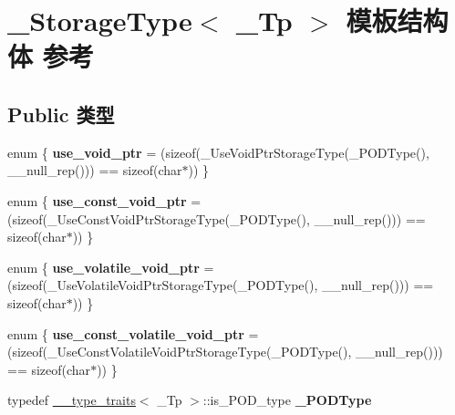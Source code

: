 \hypertarget{struct___storage_type}{}\section{\+\_\+\+Storage\+Type$<$ \+\_\+\+Tp $>$ 模板结构体 参考}
\label{struct___storage_type}
\subsection*{Public 类型}
\begin{DoxyCompactItemize}
\item 
\mbox{\label{struct___storage_type_ad8fc37c8da5e94bd646f970189a1dfbb}} 
enum \{ {\bfseries use\+\_\+void\+\_\+ptr} = (sizeof(\+\_\+\+Use\+Void\+Ptr\+Storage\+Type(\+\_\+\+P\+O\+D\+Type(), \+\_\+\+\_\+null\+\_\+rep())) == sizeof(char$\ast$))
 \}
\item 
\mbox{\label{struct___storage_type_a3dacabc4c811d5e5b0f2bfee4178b3bd}} 
enum \{ {\bfseries use\+\_\+const\+\_\+void\+\_\+ptr} = (sizeof(\+\_\+\+Use\+Const\+Void\+Ptr\+Storage\+Type(\+\_\+\+P\+O\+D\+Type(), \+\_\+\+\_\+null\+\_\+rep())) == sizeof(char$\ast$))
 \}
\item 
\mbox{\label{struct___storage_type_a2af373c63e21d6ac847fb5f68c24db16}} 
enum \{ {\bfseries use\+\_\+volatile\+\_\+void\+\_\+ptr} = (sizeof(\+\_\+\+Use\+Volatile\+Void\+Ptr\+Storage\+Type(\+\_\+\+P\+O\+D\+Type(), \+\_\+\+\_\+null\+\_\+rep())) == sizeof(char$\ast$))
 \}
\item 
\mbox{\label{struct___storage_type_aa49554231626bcc1fe111770441d5754}} 
enum \{ {\bfseries use\+\_\+const\+\_\+volatile\+\_\+void\+\_\+ptr} = (sizeof(\+\_\+\+Use\+Const\+Volatile\+Void\+Ptr\+Storage\+Type(\+\_\+\+P\+O\+D\+Type(), \+\_\+\+\_\+null\+\_\+rep())) == sizeof(char$\ast$))
 \}
\item 
\mbox{\label{struct___storage_type_a04e431f5f6eb329c29b19c47b8e464bc}} 
typedef \hyperlink{struct____type__traits}{\+\_\+\+\_\+type\+\_\+traits}$<$ \+\_\+\+Tp $>$\+::is\+\_\+\+P\+O\+D\+\_\+type {\bfseries \+\_\+\+P\+O\+D\+Type}
\item 
\mbox{\label{struct___storage_type_a1a312bfe93ff7caadecfa59e85ffd983}} 

\end{DoxyCompactItemize}
